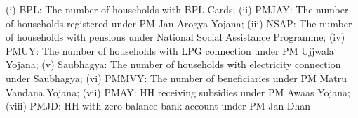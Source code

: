 \begin{table}[!htbp]
\begin{threeparttable}
\begin{tablenotes}[flushleft]
                   (i) BPL: The number of households with BPL Cards;
                   (ii) PMJAY: The number of households registered under PM Jan Arogya Yojana;
                   (iii) NSAP: The number of households with pensions under National Social Assistance Programme;
                   (iv) PMUY: The number of households with LPG connection under PM Ujjwala Yojana;
                   (v) Saubhagya: The number of households with electricity connection under Saubhagya;
                   (vi) PMMVY: The number of beneficiaries under PM Matru Vandana Yojana;
                   (vii) PMAY: HH receiving subsidies under PM Awaas Yojana;
                   (viii) PMJD: HH with zero-balance bank account under PM Jan Dhan
\end{tablenotes}
\end{threeparttable}
\end{table}
